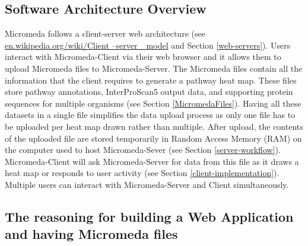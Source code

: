 \subsection{Software Architecture Overview}

Micromeda follows a client-server web architecture \cite{svobodova1985client} (see \href{en.wikipedia.org/wiki/Client–server\_model}{en.wikipedia.org/wiki/Client –server \_model} and Section \ref{web-servers}). Users interact with Micromeda-Client via their web browser and it allows them to upload Micromeda files to Micromeda-Server. The Micromeda files contain all the information that the client requires to generate a pathway heat map. These files store pathway annotations, InterProScan5 output data, and supporting protein sequences for multiple organisms (see Section \ref{MicromedaFiles}). Having all these datasets in a single file simplifies the data upload process as only one file has to be uploaded per heat map drawn rather than multiple. After upload, the contents of the uploaded file are stored temporarily in Random Access Memory (RAM) on the computer used to host Micromeda-Sever (see Section \ref{server-workflow}). Micromeda-Client will ask Micromeda-Server for data from this file as it draws a heat map or responds to user activity (see Section \ref{client-implementation}). Multiple users can interact with Micromeda-Server and Client simultaneously.

\subsection{The reasoning for building a Web Application and having Micromeda files}

